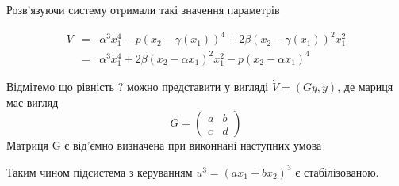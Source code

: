 \documentclass{article}
\begin{document}
Розв'язуючи  систему отримали такі значення параметрів 

\begin{eqnarray}
    \dot V &=& \alpha^3x_{1}^4 - p(x_2-\gamma(x_1))^4
    +2\beta(x_2-\gamma(x_1))^2x_{1}^2\nonumber\\ 
    &=&\alpha^3x_{1}^4 + 2\beta(x_2-\alpha x_1)^2x_{1}^2
    -p(x_2-\alpha x_1)^4
\end{eqnarray}

Відмітемо що рівність ? можно представити у вигляді $\dot V =(Gy,y)$, де 
мариця має вигляд 
\begin{equation}
G=\left(\begin{array}{clr}
    a & b\\
    c & d
\end{array}\right) 
\end{equation}
Матриця G є від'ємно визначена при виконнані наступних умова

Таким чином підсистема з керуванням  $u^3=(ax_1+bx_2)^3$ 
є стабілізованою. 
\end{document}
